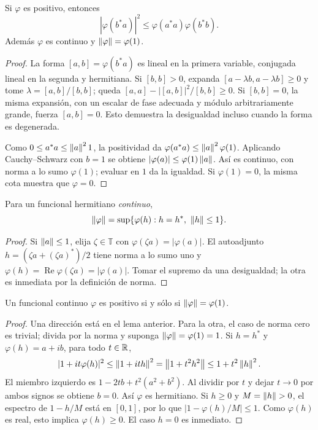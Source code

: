 \begin{lema}\label{v3:cs-positivo}
Si $\varphi$ es positivo, entonces
\[
 |\varphi(b^*a)|^2\le\varphi(a^*a)\varphi(b^*b).
\]
Además $\varphi$ es continuo y $\left\lVert\varphi\right\rVert=\varphi(1)$.
\end{lema}
\begin{proof}
La forma $[a,b]=\varphi(b^*a)$ es lineal en la primera variable, conjugada lineal en la segunda y hermitiana. Si $[b,b]>0$, expanda $[a-\lambda b,a-\lambda b]\ge0$ y tome $\lambda=[a,b]/[b,b]$; queda $[a,a]-|[a,b]|^2/[b,b]\ge0$. Si $[b,b]=0$, la misma expansión, con un escalar de fase adecuada y módulo arbitrariamente grande, fuerza $[a,b]=0$. Esto demuestra la desigualdad incluso cuando la forma es degenerada.

Como $0\le a^*a\le\left\lVert a\right\rVert^21$, la positividad da $\varphi(a^*a)\le\left\lVert a\right\rVert^2\varphi(1)$. Aplicando Cauchy--Schwarz con $b=1$ se obtiene $|\varphi(a)|\le\varphi(1)\left\lVert a\right\rVert$. Así es continuo, con norma a lo sumo $\varphi(1)$; evaluar en $1$ da la igualdad. Si $\varphi(1)=0$, la misma cota muestra que $\varphi=0$.
\end{proof}

\begin{proposicion}
Para un funcional hermitiano \emph{continuo},
\[
 \left\lVert\varphi\right\rVert=\sup\{\varphi(h):h=h^*,\ \left\lVert h\right\rVert\le1\}.
\]
\end{proposicion}
\begin{proof}
Si $\left\lVert a\right\rVert\le1$, elija $\zeta\in\mathbb T$ con $\varphi(\zeta a)=|\varphi(a)|$. El autoadjunto $h=(\zeta a+(\zeta a)^*)/2$ tiene norma a lo sumo uno y $\varphi(h)=\operatorname{Re}\varphi(\zeta a)=|\varphi(a)|$. Tomar el supremo da una desigualdad; la otra es inmediata por la definición de norma.
\end{proof}

\begin{teorema}\label{v3:estado-norma}
Un funcional continuo $\varphi$ es positivo si y sólo si $\left\lVert\varphi\right\rVert=\varphi(1)$.
\end{teorema}
\begin{proof}
Una dirección está en el lema anterior. Para la otra, el caso de norma cero es trivial; divida por la norma y suponga $\left\lVert\varphi\right\rVert=\varphi(1)=1$. Si $h=h^*$ y $\varphi(h)=a+ib$, para todo $t\in\mathbb R$,
\[
 |1+it\varphi(h)|^2\le\left\lVert1+ith\right\rVert^2
 =\left\lVert1+t^2h^2\right\rVert\le1+t^2\left\lVert h\right\rVert^2.
\]
El miembro izquierdo es $1-2tb+t^2(a^2+b^2)$. Al dividir por $t$ y dejar $t\to0$ por ambos signos se obtiene $b=0$. Así $\varphi$ es hermitiano. Si $h\ge0$ y $M=\left\lVert h\right\rVert>0$, el espectro de $1-h/M$ está en $[0,1]$, por lo que $|1-\varphi(h)/M|\le1$. Como $\varphi(h)$ es real, esto implica $\varphi(h)\ge0$. El caso $h=0$ es inmediato.
\end{proof}


